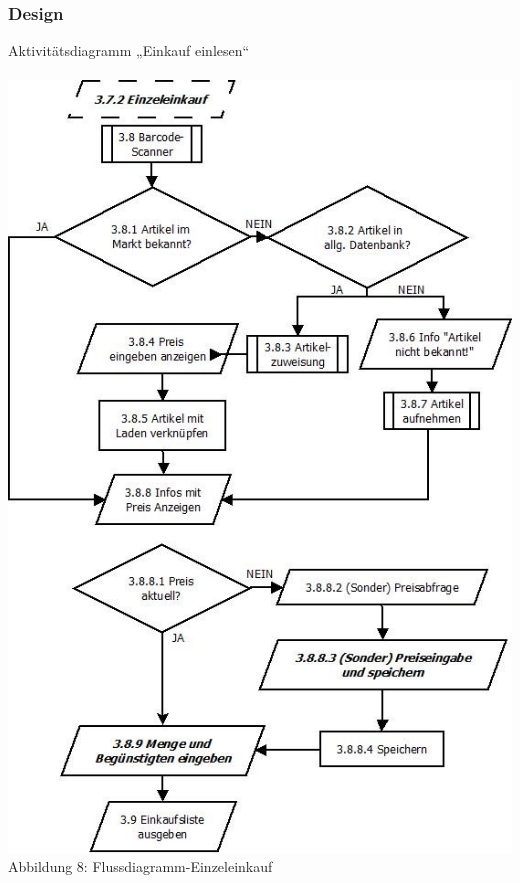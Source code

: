 \documentclass[12pt,a4paper]{article}
\begin{document}
\subsubsection*{Design}
Aktivitätsdiagramm „Einkauf einlesen“ 
\\
\\
\hspace*{-10mm} 
\includegraphics[scale=0.7]{Einzeleinkauf_Diagramm.jpg}
\\
\footnotesize Abbildung 8: Flussdiagramm-Einzeleinkauf
\\
\\
\end{document}
